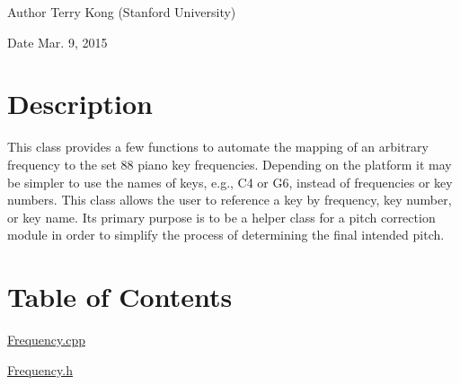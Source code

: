 \begin{DoxyAuthor}{Author}
Terry Kong (Stanford University) 
\end{DoxyAuthor}
\begin{DoxyDate}{Date}
Mar. 9, 2015
\end{DoxyDate}
\hypertarget{index_desc_sec}{}\section{Description}\label{index_desc_sec}
This class provides a few functions to automate the mapping of an arbitrary frequency to the set 88 piano key frequencies. Depending on the platform it may be simpler to use the names of keys, e.\+g., C4 or G6, instead of frequencies or key numbers. This class allows the user to reference a key by frequency, key number, or key name. It\textquotesingle{}s primary purpose is to be a helper class for a pitch correction module in order to simplify the process of determining the final intended pitch.\hypertarget{index_contents_sec}{}\section{Table of Contents}\label{index_contents_sec}
\hyperlink{_frequency_8cpp}{Frequency.\+cpp}

\hyperlink{_frequency_8h}{Frequency.\+h} 